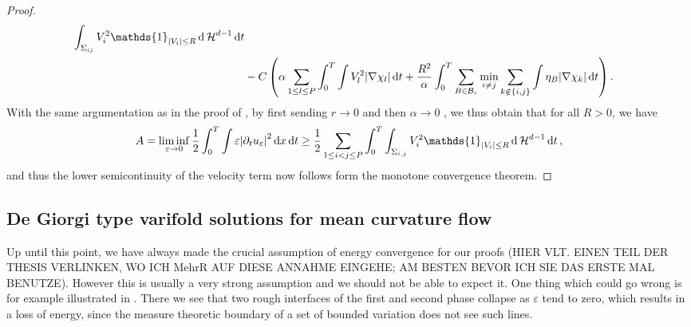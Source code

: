 \begin{proof}
\begin{align*}
				\int_{ \Sigma_{ i j } }
					V_{ i }^{ 2 } \mathds{ 1 }_{ \abs{ V_{ i } } \leq R }
				\dd{ \hm^{ d - 1 } }
			\dd{ t }
		\\
		& -
		C \left(
			\alpha \sum_{ 1 \leq l \leq P }
				\int_{ 0 }^{ T }
					\int
						V_{ l }^{ 2 }
					\abs{ \nabla \chi_{ l } }
				\dd{ t }
			+
			\frac{ R^{ 2 } }{ \alpha }
			\int_{ 0 }^{ T }
				\sum_{ B \in \mathcal{ B }_{ r } }
					\min_{ i \neq j }
						\sum_{ k \notin \{ i , j \} }
							\int
								\eta_{ B }
							\abs{ \nabla \chi_{ k } }
			\dd{ t }
		\right).
	\end{align*}
	With the same argumentation as in the proof of 
	, by first sending $ r \to 0 $ and then 
	$ \alpha \to 0$ , we thus obtain that for all $R > 0 $, we have
	\begin{equation*}
		A = \liminf_{ \varepsilon \to 0 } \frac{ 1 }{ 2 }
		\int_{ 0 }^{ T }
			\int
				\varepsilon \abs{ \partial_{ t } u_{ \varepsilon } }^{ 2 }
			\dd{ x }
		\dd{ t }
		\geq
		\frac{ 1 }{ 2 }
		\sum_{ 1 \leq i < j \leq P }
			\int_{ 0 }^{ T }
				\int_{ \Sigma_{ i , j } }
					V_{ i }^{ 2 }
					\mathds{ 1 }_{ \abs{ V_{ i } } \leq R }
				\dd{ \hm^{ d - 1 } }
			\dd{ t },
	\end{equation*}
	and thus the lower semicontinuity of the velocity term now follows form the 
	monotone convergence theorem.
\end{proof}

\subsection{De Giorgi type varifold solutions for mean curvature flow}

Up until this point, we have always made the crucial assumption of energy 
convergence for our proofs (HIER VLT. EINEN TEIL DER THESIS VERLINKEN, WO ICH 
MehrR AUF DIESE ANNAHME EINGEHE; AM BESTEN BEVOR ICH SIE DAS ERSTE MAL BENUTZE).
However this is usually a very strong assumption and we should not be able to 
expect it. One thing which could go wrong is for example illustrated in 
. There we see that two rough interfaces of 
the first and second phase collapse as $ \varepsilon $ tend to zero, which 
results in a loss of energy, since the measure theoretic boundary of a set of 
bounded variation does not see such lines.

